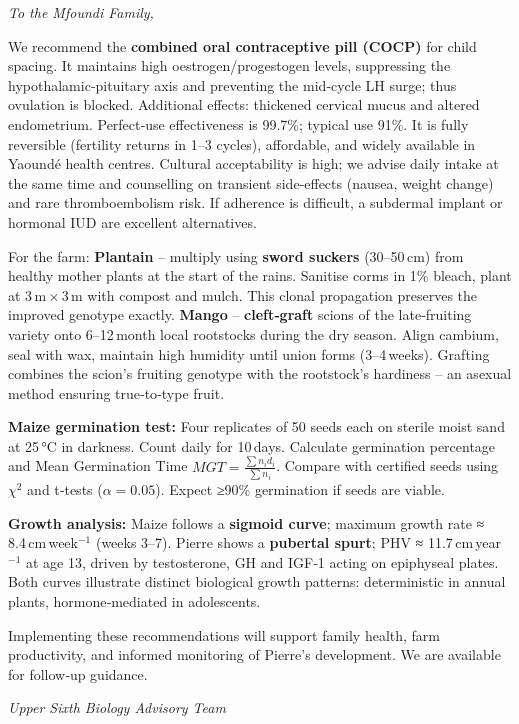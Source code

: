 \documentclass[11pt]{article}
\newcommand{\cle}[1]{{\popxbold\color{popdark}#1}}
\begin{document}
\begin{exemplebox}
\textit{To the Mfoundi Family,}

We recommend the \textbf{combined oral contraceptive pill (COCP)} for child spacing. It maintains high oestrogen/progestogen levels, suppressing the hypothalamic‑pituitary axis and preventing the mid‑cycle LH surge; thus ovulation is blocked. Additional effects: thickened cervical mucus and altered endometrium. Perfect‑use effectiveness is 99.7\%; typical use 91\%. It is fully reversible (fertility returns in 1–3 cycles), affordable, and widely available in Yaoundé health centres. Cultural acceptability is high; we advise daily intake at the same time and counselling on transient side‑effects (nausea, weight change) and rare thromboembolism risk. If adherence is difficult, a subdermal implant or hormonal IUD are excellent alternatives.

For the farm: \textbf{Plantain} – multiply using \textbf{sword suckers} (30–50 cm) from healthy mother plants at the start of the rains. Sanitise corms in 1\% bleach, plant at 3 m × 3 m with compost and mulch. This \cle{clonal propagation} preserves the improved genotype exactly. \textbf{Mango} – \textbf{cleft‑graft} scions of the late‑fruiting variety onto 6–12 month local rootstocks during the dry season. Align cambium, seal with wax, maintain high humidity until union forms (3–4 weeks). Grafting combines the scion’s fruiting genotype with the rootstock’s hardiness – an asexual method ensuring true‑to‑type fruit.

\textbf{Maize germination test:} Four replicates of 50 seeds each on sterile moist sand at 25 °C in darkness. Count daily for 10 days. Calculate germination percentage and Mean Germination Time \(MGT = \frac{\sum n_i d_i}{\sum n_i}\). Compare with certified seeds using \(\chi^2\) and t‑tests (\(\alpha=0.05\)). Expect ≥90\% germination if seeds are viable.

\textbf{Growth analysis:} Maize follows a \textbf{sigmoid curve}; maximum growth rate ≈ 8.4 cm week\(^{-1}\) (weeks 3–7). Pierre shows a \textbf{pubertal spurt}; PHV ≈ 11.7 cm year\(^{-1}\) at age 13, driven by testosterone, GH and IGF‑1 acting on epiphyseal plates. Both curves illustrate distinct biological growth patterns: deterministic in annual plants, hormone‑mediated in adolescents.

Implementing these recommendations will support family health, farm productivity, and informed monitoring of Pierre’s development. We are available for follow‑up guidance.

\textit{Upper Sixth Biology Advisory Team}
\end{exemplebox}
\end{document}
